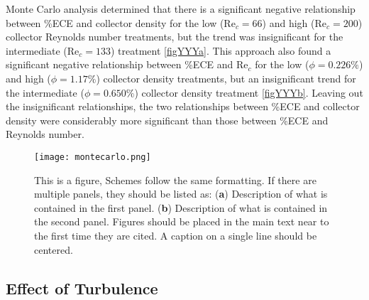 \documentclass[geosciences,article,submit,moreauthors,pdftex]{Definitions/mdpi}
\newcommand\Rey{\mathrm{Re}}
\begin{document}
Monte Carlo analysis determined that there is a significant negative relationship between \%ECE and collector density for the low ($\Rey_c = 66$) and high ($\Rey_c = 200$) collector Reynolds number treatments, but the trend was insignificant for the intermediate ($\Rey_c = 133$) treatment \ref{figYYYa}. This approach also found a significant negative relationship between \%ECE and $\Rey_c$ for the low ($\phi = 0.226\%$) and high ($\phi = 1.17\%$) collector density treatments, but an insignificant trend for the intermediate ($\phi = 0.650\%$) collector density treatment \ref{figYYYb}. Leaving out the insignificant relationships, the two relationships between \%ECE and collector density were considerably more significant than those between \%ECE and Reynolds number.

\begin{figure}[H]
\centering
\texttt{[image: montecarlo.png]}
\caption{This is a figure, Schemes follow the same formatting. If there are multiple panels, they should be listed as: (\textbf{a}) Description of what is contained in the first panel. (\textbf{b}) Description of what is contained in the second panel. Figures should be placed in the main text near to the first time they are cited. A caption on a single line should be centered.}
\end{figure}   

\subsection{Effect of Turbulence}
\end{document}
